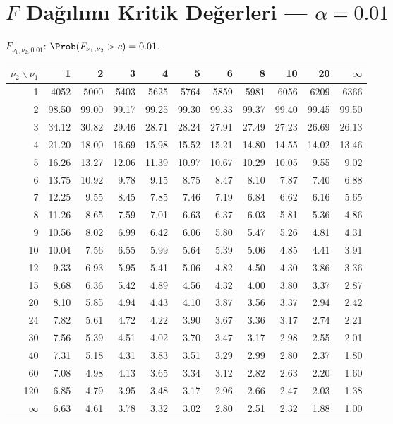 \section{$F$ Dağılımı Kritik Değerleri — $\alpha=0.01$}
\label{app:f_tablo_01}

$F_{\nu_1,\nu_2,0.01}$: $\Prob(F_{\nu_1,\nu_2} > c) = 0.01$.

\begin{center}
\footnotesize
\renewcommand{\arraystretch}{1.12}
\begin{tabular}{r|rrrrrrrrrr}
\hline
$\nu_2 \backslash \nu_1$ & 1 & 2 & 3 & 4 & 5 & 6 & 8 & 10 & 20 & $\infty$ \\
\hline
1  & 4052 & 5000 & 5403 & 5625 & 5764 & 5859 & 5981 & 6056 & 6209 & 6366 \\
2  & 98.50 & 99.00 & 99.17 & 99.25 & 99.30 & 99.33 & 99.37 & 99.40 & 99.45 & 99.50 \\
3  & 34.12 & 30.82 & 29.46 & 28.71 & 28.24 & 27.91 & 27.49 & 27.23 & 26.69 & 26.13 \\
4  & 21.20 & 18.00 & 16.69 & 15.98 & 15.52 & 15.21 & 14.80 & 14.55 & 14.02 & 13.46 \\
5  & 16.26 & 13.27 & 12.06 & 11.39 & 10.97 & 10.67 & 10.29 & 10.05 &  9.55 &  9.02 \\
6  & 13.75 & 10.92 &  9.78 &  9.15 &  8.75 &  8.47 &  8.10 &  7.87 &  7.40 &  6.88 \\
7  & 12.25 &  9.55 &  8.45 &  7.85 &  7.46 &  7.19 &  6.84 &  6.62 &  6.16 &  5.65 \\
8  & 11.26 &  8.65 &  7.59 &  7.01 &  6.63 &  6.37 &  6.03 &  5.81 &  5.36 &  4.86 \\
9  & 10.56 &  8.02 &  6.99 &  6.42 &  6.06 &  5.80 &  5.47 &  5.26 &  4.81 &  4.31 \\
10 & 10.04 &  7.56 &  6.55 &  5.99 &  5.64 &  5.39 &  5.06 &  4.85 &  4.41 &  3.91 \\
12 &  9.33 &  6.93 &  5.95 &  5.41 &  5.06 &  4.82 &  4.50 &  4.30 &  3.86 &  3.36 \\
15 &  8.68 &  6.36 &  5.42 &  4.89 &  4.56 &  4.32 &  4.00 &  3.80 &  3.37 &  2.87 \\
20 &  8.10 &  5.85 &  4.94 &  4.43 &  4.10 &  3.87 &  3.56 &  3.37 &  2.94 &  2.42 \\
24 &  7.82 &  5.61 &  4.72 &  4.22 &  3.90 &  3.67 &  3.36 &  3.17 &  2.74 &  2.21 \\
30 &  7.56 &  5.39 &  4.51 &  4.02 &  3.70 &  3.47 &  3.17 &  2.98 &  2.55 &  2.01 \\
40 &  7.31 &  5.18 &  4.31 &  3.83 &  3.51 &  3.29 &  2.99 &  2.80 &  2.37 &  1.80 \\
60 &  7.08 &  4.98 &  4.13 &  3.65 &  3.34 &  3.12 &  2.82 &  2.63 &  2.20 &  1.60 \\
120 & 6.85 &  4.79 &  3.95 &  3.48 &  3.17 &  2.96 &  2.66 &  2.47 &  2.03 &  1.38 \\
$\infty$ & 6.63 & 4.61 & 3.78 & 3.32 & 3.02 & 2.80 & 2.51 & 2.32 & 1.88 & 1.00 \\
\hline
\end{tabular}
\end{center}

